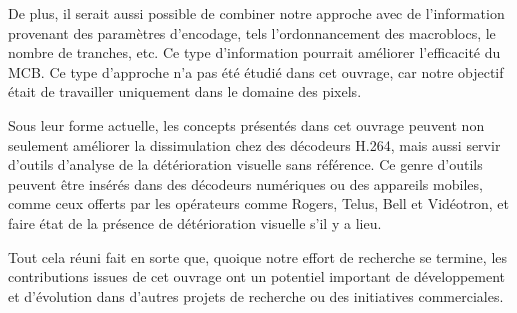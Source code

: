 De plus, il serait aussi possible de combiner notre approche avec de
l'information provenant des paramètres d'encodage, tels l'ordonnancement des
macroblocs, le nombre de tranches, etc. Ce type d'information pourrait améliorer
l'efficacité du MCB. Ce type d'approche n'a pas été étudié dans cet ouvrage,
car notre objectif était de travailler uniquement dans le domaine des pixels.

Sous leur forme actuelle, les concepts présentés dans cet ouvrage peuvent non
seulement améliorer la dissimulation chez des décodeurs H.264, mais aussi servir
d'outils d'analyse de la détérioration visuelle sans référence. Ce genre
d'outils peuvent être insérés dans des décodeurs numériques ou des appareils
mobiles, comme ceux offerts par les opérateurs comme Rogers, Telus, Bell et
Vidéotron, et faire état de la présence de détérioration visuelle s'il y a lieu.

Tout cela réuni fait en sorte que, quoique notre effort de recherche se termine,
les contributions issues de cet ouvrage ont un potentiel important de
développement et d'évolution dans d'autres projets de recherche ou des
initiatives commerciales.
